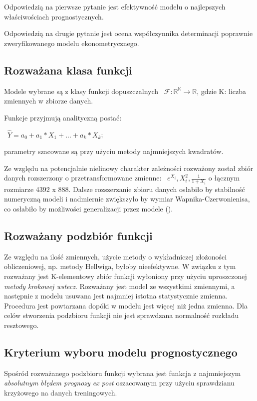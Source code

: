 \documentclass{article}
\begin{document}
Odpowiedzią na pierwsze pytanie jest efektywność modelu o najlepszych właściwościach prognostycznych.

Odpowiedzią na drugie pytanie jest ocena współczynnika determinacji poprawnie zweryfikowanego modelu ekonometrycznego.

\subsection{Rozważana klasa funkcji}
Modele wybrane są z klasy funkcji dopuszczalnych ~$\mathscr{F}: \mathbb{R^K\to R}$,
gdzie K: liczba zmiennych w zbiorze danych.

Funkcje przyjmują analityczną postać:

~$\hat{Y}=a_0+a_1*X_1+...+a_k*X_k$;

parametry szacowane są przy użyciu metody najmniejszych kwadratów.

Ze względu na potencjalnie nielinowy charakter zależności rozważony został zbiór danych rozszerzony o przetransformowane zmienne: ~$e^{X_i}, X_i^2, \frac{1}{1+X_i}$ o łącznym rozmiarze 4392 x 888. Dalsze rozszerzanie zbioru danych osłabiło by stabilność numeryczną modeli i nadmiernie zwiększyło by wymiar Wapnika-Czerwonienisa, co osłabiło by możliwości generalizacji przez modele (\textcite{Kaminski2017}).

\newpage
\subsection{Rozważany podzbiór funkcji}
Ze względu na ilość zmiennych, użycie metody o wykładniczej złożoności obliczeniowej, np. metody Hellwiga, byłoby nieefektywne. W związku z tym rozważany jest K-elementowy zbiór funkcji wyłoniony przy użyciu uproszczonej \textit{metody krokowej wstecz}. Rozważany jest model ze wszystkimi zmiennymi, a następnie z modelu usuwana jest najmniej istotna statystycznie zmienna. Procedura jest powtarzana dopóki w modelu jest więcej niż jedna zmienna. Dla celów stworzenia podzbioru funkcji nie jest sprawdzana normalność rozkładu resztowego.

\subsection{Kryterium wyboru modelu prognostycznego}
Spośród rozważanego podzbioru funkcji wybrana jest funkcja z najmniejszym \textit{absolutnym błędem prognozy ex post} oszacowanym przy użyciu sprawdzianu krzyżowego na danych treningowych.
\end{document}
